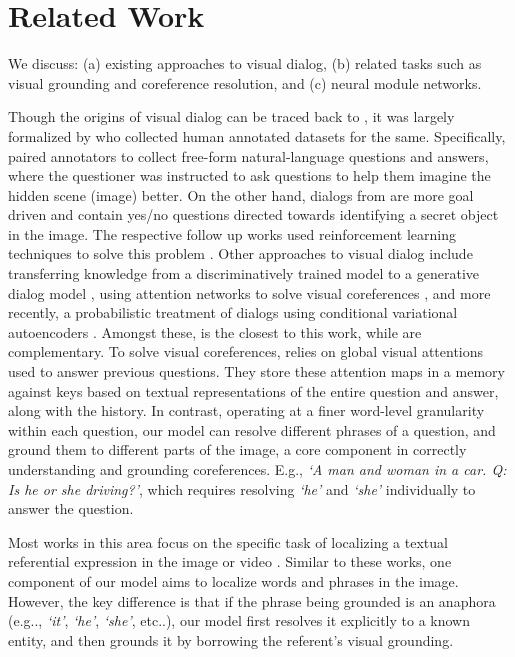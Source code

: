 \documentclass[runningheads]{llncs}
\makeatletter
\DeclareRobustCommand\onedot{\futurelet\@let@token\@onedot}
\def\@onedot{\ifx\@let@token.\else.\null\fi\xspace}
\def\eg{e.g\onedot} \def\Eg{E.g\onedot}
\def\etc{etc\onedot} \def\vs{vs\onedot}
\def\vs{vs\onedot}
\newcommand{\myparagraph}[1]{\vspace{0pt}\noindent{\bf #1}}
\makeatother
\begin{document}
% 
\section{Related Work}
We discuss:
(a) existing approaches to visual dialog, 
(b) related tasks such as visual grounding and coreference resolution, and
(c) neural module networks.

\myparagraph{Visual Dialog.}
Though the origins of visual dialog can be traced back to \cite{winograd1971procedures,geman_pnas14},
it was largely formalized by \cite{visdial,guesswhat} who collected 
human annotated datasets for the same.
Specifically, \cite{visdial} paired annotators to collect free-form 
natural-language questions and answers, where the questioner was instructed to 
ask questions to help them imagine the hidden scene (image) better.
On the other hand, dialogs from \cite{guesswhat} are more goal driven
and contain yes/no questions directed towards identifying a secret object in 
the image.
The respective follow up works used reinforcement learning techniques to solve
this problem \cite{visdial_rl,DBLP:journals/corr/StrubVMPCP17}.
Other approaches to visual dialog include transferring knowledge from a 
discriminatively trained model to a generative dialog model \cite{lu_nips16}, 
using attention networks to solve visual coreferences \cite{paul2017visual},
and more recently, a probabilistic treatment of dialogs using conditional
variational autoencoders \cite{1802.03803}.
Amongst these, \cite{paul2017visual} is the closest to this work, while
\cite{lu_nips16,1802.03803} are complementary.
To solve visual coreferences, \cite{paul2017visual} relies on global visual 
attentions used to answer previous questions.
They store these attention maps in a memory against keys based on textual 
representations of the entire question and answer, along with the history.
In contrast, operating at a finer word-level granularity within each 
question, our model can resolve different phrases of a question, and 
ground them to different parts of the image, a core component in correctly 
understanding and grounding coreferences.
E.g.,  \textit{`A man and woman in a car. Q: Is he or she 
driving?'}, which requires resolving \textit{`he'} and \textit{`she'}
individually to answer the question.




\myparagraph{Grounding language in images and video.}
Most works in this area focus on the specific task of localizing a textual 
referential expression in the image 
\cite{hu16cvpr,kong14cvpr,mao16cvpr,plummer15iccv,rohrbach16eccv,wang2016cvpr,yu16eccv}
or video
\cite{regneri13tacl,lin14cvpr,yu13acl,hendricks17iccv}.
Similar to these works, one component of our model aims to localize words and 
phrases in the image.
However, the key difference is that if the phrase being grounded is an anaphora
(\eg, \textit{`it'}, \textit{`he'}, \textit{`she'}, \etc),
our model first resolves it explicitly to a known entity, and then grounds it
by borrowing the referent's visual grounding.
\end{document}
